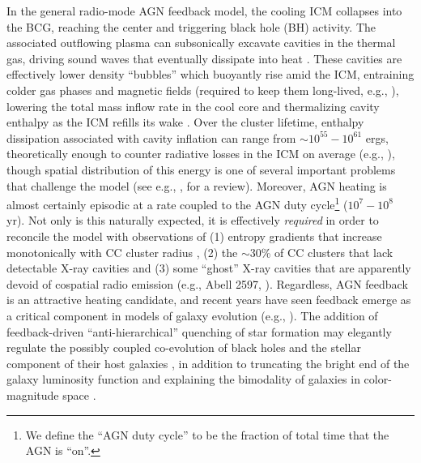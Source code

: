 In  the  general  radio-mode  AGN  feedback  model,  the  cooling  ICM
collapses into the BCG, reaching  the center and triggering black hole
(BH)  activity.   The associated  outflowing  plasma can  subsonically
excavate  cavities  in  the  thermal  gas, driving  sound  waves  that
eventually dissipate  into heat \citep{fabian03}.   These cavities are
effectively lower  density ``bubbles''  which buoyantly rise  amid the
ICM,  entraining colder gas  phases and  magnetic fields  (required to
keep them long-lived, e.g., \citealt{robinson04,dursi08}), lowering the total mass inflow rate in the cool
core  and thermalizing  cavity enthalpy  as the  ICM refills  its wake
\citep{begelman01,ruszkowski02,churazov02,reynolds02,birzan04}.    Over
the  cluster  lifetime, enthalpy  dissipation  associated with  cavity
inflation  can  range  from $\sim10^{55}-10^{61}$  ergs,  theoretically
enough  to counter  radiative  losses  in the  ICM  on average  (e.g.,
\citealt{birzan04,rafferty06}),  though spatial  distribution  of this
energy is one  of several important problems that  challenge the model
(see e.g., \citealt{mcnamara07}, for a review).  Moreover, AGN heating
is almost certainly episodic at a  rate coupled to the AGN duty cycle\footnote{We define the ``AGN duty cycle'' to be the fraction of total time that the AGN is ``on''.} ($10^7-10^8$ yr).
Not only is this naturally  expected, it is effectively {\it required}
in  order to  reconcile the  model  with observations  of (1)  entropy
gradients   that  increase  monotonically   with  CC   cluster  radius
\citep{kaiser03},  (2)  the  $\sim  30$\%  of CC  clusters  that  lack
detectable X-ray cavities \citep{dunn06}  and (3) some ``ghost'' X-ray
cavities that are apparently devoid of cospatial radio emission (e.g.,
Abell 2597, \citealt{mcnamara01}).
Regardless, AGN  feedback is an attractive heating  candidate, and recent years
have seen feedback  emerge as a critical  component in models of galaxy
evolution (e.g.,   \citealt{springel05}).   The   addition   of
feedback-driven ``anti-hierarchical''  quenching  of   star  formation  may
elegantly regulate  the possibly coupled  co-evolution  of black  holes  and the
stellar component           of          their           host          galaxies
\citep{magorrian98,ferrarese00,gebhardt00}, in  addition to truncating the
bright  end of the  galaxy luminosity function and  explaining the bimodality
of     galaxies      in      color-magnitude     space
\citep[e.g.,][]{silk98,scannapieco05,bower06,croton06,sijacki07}.






